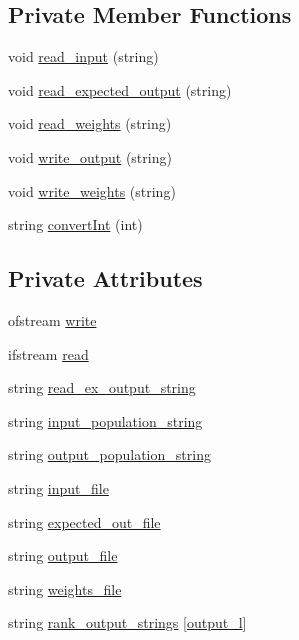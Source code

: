 \subsection*{Private Member Functions}
\begin{DoxyCompactItemize}
\item 
void \hyperlink{a00001_a1134b607af353e187667aaba1a960bdd}{read\-\_\-input} (string)
\item 
void \hyperlink{a00001_a4b0a0ad74a4446e5f23020521200b932}{read\-\_\-expected\-\_\-output} (string)
\item 
void \hyperlink{a00001_a7d2759b2ad892445e7d74892737547cf}{read\-\_\-weights} (string)
\item 
void \hyperlink{a00001_a4e104949ad8e8fd75c612313f857ee5a}{write\-\_\-output} (string)
\item 
void \hyperlink{a00001_a67e37c5e1429df91a8c4ff836579cdc0}{write\-\_\-weights} (string)
\item 
string \hyperlink{a00001_a6b29a9f88396627c1d39170723bad7fd}{convert\-Int} (int)
\end{DoxyCompactItemize}
\subsection*{Private Attributes}
\begin{DoxyCompactItemize}
\item 
ofstream \hyperlink{a00001_a7d29cb8d04a1a60638f653c28a628095}{write}
\item 
ifstream \hyperlink{a00001_a035fb2bdf99f8f928d049bc950c81f4c}{read}
\item 
string \hyperlink{a00001_af7d8ea2c0a997e16600478c0020b1858}{read\-\_\-ex\-\_\-output\-\_\-string}
\item 
string \hyperlink{a00001_a80f6d8f738cbc4d10154b470c5422fdd}{input\-\_\-population\-\_\-string}
\item 
string \hyperlink{a00001_a4266a9bec2fff5d17d7abf06e00384db}{output\-\_\-population\-\_\-string}
\item 
string \hyperlink{a00001_a78b144182e3cfc70f9aae78ebdd66e51}{input\-\_\-file}
\item 
string \hyperlink{a00001_a8b8f5c9cc3ffcb083ccc4fce1c05ca44}{expected\-\_\-out\-\_\-file}
\item 
string \hyperlink{a00001_a63725670a06637b4290c54eba671b640}{output\-\_\-file}
\item 
string \hyperlink{a00001_aab02256124e6eb39e10e3c9765f0bcb3}{weights\-\_\-file}
\item 
string \hyperlink{a00001_a578abb99a35121fea6c83f1dc21cc2af}{rank\-\_\-output\-\_\-strings} \mbox{[}\hyperlink{a00008_a0a0ddfc9fb3bc3d90d175ed1f7bd54c5}{output\-\_\-l}\mbox{]}
\end{DoxyCompactItemize}


